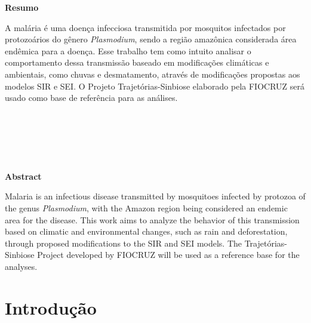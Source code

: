 \documentclass[12pt]{article}
\begin{document}
\newpage
\begin{center}
    \textbf{Resumo}
\end{center}

A malária é uma doença infecciosa transmitida por mosquitos infectados por protozoários do gênero \textit{Plasmodium}, sendo a região amazônica considerada área endêmica para a doença. Esse trabalho tem como intuito analisar o comportamento dessa transmissão baseado em modificações climáticas e ambientais, como chuvas e desmatamento, através de modificações propostas aos modelos SIR e SEI. O Projeto Trajetórias-Sinbiose elaborado pela FIOCRUZ será usado como base de referência para as análises.
\\\\
\\\\
\\\\
\begin{center}
    \textbf{Abstract}
\end{center}

Malaria is an infectious disease transmitted by mosquitoes infected by protozoa of the genus \textit{Plasmodium}, with the Amazon region being considered an endemic area for the disease. This work aims to analyze the behavior of this transmission based on climatic and environmental changes, such as rain and deforestation, through proposed modifications to the SIR and SEI models. The Trajetórias-Sinbiose Project developed by FIOCRUZ will be used as a reference base for the analyses.


\newpage
\tableofcontents
\thispagestyle{empty}

\newpage



\section{Introdução}
\end{document}
